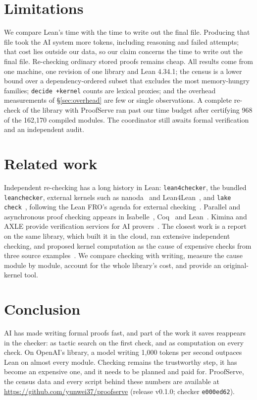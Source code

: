 \documentclass[10pt,twocolumn]{article}
\newcommand{\dk}{\texttt{decide +kernel}}
\begin{document}
\section{Limitations}\label{sec:limits}
We compare Lean's time with the time to write out the final file. Producing
that file took the AI system more tokens, including reasoning and failed
attempts; that cost lies outside our data, so our claim concerns the time
to write out the final file. Re-checking ordinary stored proofs remains
cheap. All results come from one machine, one revision of one library and
Lean 4.34.1; the census is a lower bound over a dependency-ordered subset
that excludes the most memory-hungry families; \dk{} counts are lexical proxies;
and the overhead measurements of \S\ref{sec:overhead} are few or single
observations. A complete re-check of the library with ProofServe ran past
our time budget after certifying 968 of the 162,170 compiled modules. The
coordinator still awaits formal verification and an independent audit.

\section{Related work}\label{sec:related}
Independent re-checking has a long history in Lean: \texttt{lean4checker},
the bundled \texttt{leanchecker}, external kernels such as
nanoda~\cite{nanoda2026} and Lean4Lean~\cite{lean4lean2025}, and
\texttt{lake check}~\cite{leanCheckerDocs,lean435Check}, following the Lean
FRO's agenda for external checking~\cite{leanFroY4}. Parallel and
asynchronous proof checking appears in Isabelle~\cite{wenzelParallel2009},
Coq~\cite{coqAsync2015} and Lean~\cite{leanParallelRelease2025,leanKernelParallel2025}.
Kimina and AXLE provide verification services for AI
provers~\cite{kiminaPaper,axle}. The closest work is a report on the same
library, which built it in the cloud, ran extensive independent checking,
and proposed kernel computation as the cause of expensive checks from three
source examples~\cite{openaiMathTooling2026}. We compare checking with
writing, measure the cause module by module, account for the whole
library's cost, and provide an original-kernel tool.

\section{Conclusion}
AI has made writing formal proofs fast, and part of the work it saves
reappears in the checker: as tactic search on the first check, and as
computation on every check. On OpenAI's library, a model writing 1,000
tokens per second outpaces Lean on almost every module. Checking remains
the trustworthy step, it has become an expensive one, and it needs to be
planned and paid for. ProofServe, the census data and every script behind
these numbers are available at \url{https://github.com/yunwei37/proofserve}
(release v0.1.0; checker \texttt{e000ed62}).


{\small\raggedright}
\end{document}
